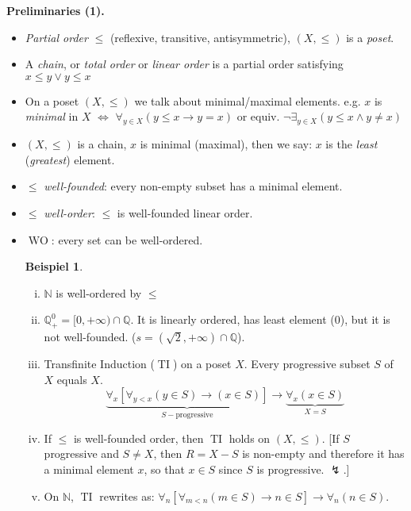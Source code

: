 \documentclass[headsepline=true,DIV=11]{scrartcl}
\theoremstyle{definition}
\newtheorem*{example}{Beispiel}
\newcommand{\WO}{\operatorname{WO}}
\newcommand{\TI}{\operatorname{TI}}
\begin{document}
{\bf Preliminaries (1).}
\begin{itemize}
	\item {\em Partial order} $\le$ (reflexive, transitive, antisymmetric), $(X,\le)$ is a {\em poset}.
	\item A {\em chain}, or {\em total order} or {\em linear order} is a partial order satisfying $x\le y\lor y\le x$
	\item On a poset $(X,\le)$ we talk about minimal/maximal elements. e.g. $x$ is {\em minimal} in $X$ $\iff$ $\forall_{y\in X}(y\le x\to y=x)$
		or equiv. $\neg \exists_{y\in X}(y\le x \land y\neq x)$
	\item $(X,\le)$ is a chain, $x$ is minimal (maximal), then we say: $x$ is the {\em least} ({\em greatest}) element.
	\item $\le$ {\em well-founded}: every non-empty subset has a minimal element.
	\item $\le$ {\em well-order}: $\le$ is well-founded linear order.
	\item $\WO$: every set can be well-ordered.
	\begin{example}
		\begin{enumerate}[(i)]
			\item $\mathbb N$ is well-ordered by $\le$
			\item $\mathbb Q^0_+ = [0,+\infty)\cap \mathbb Q$. It is linearly ordered, has least element (0), but it is not well-founded. 
				($s=(\sqrt{2}, +\infty)\cap \mathbb Q$).
			\item Transfinite Induction ($\TI$) on a poset $X$. Every progressive subset $S$ of $X$ equals $X$.
				\[\underbrace{\forall_x[\forall_{y<x}(y\in S)\to(x\in S)]}_{S-\text{progressive}}\to \underbrace{\forall_x(x\in S)}_{X=S} \]
			\item If $\le$ is well-founded order, then $\TI$ holds on $(X,\le)$.
			[If $S$ progressive and $S\neq X$, then $R=X-S$ is non-empty and therefore it has a minimal element $x$, so that $x\in S$ since $S$ is progressive. $\lightning$.]
			\item On $\mathbb N$, $\TI$ rewrites as: $\forall_n[\forall_{m<n}(m\in S)\to n\in S]\to \forall_n(n\in S)$.
		\end{enumerate}
	\end{example}
	\end{itemize}
\end{document}
